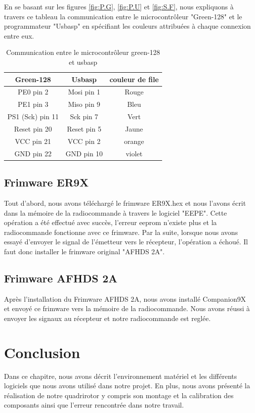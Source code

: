 	
	
	En se basant sur les figures \ref{fig:P.G}, \ref{fig:P.U} et \ref{fig:S.F}, nous expliquons à travers ce tableau la communication entre le microcontrôleur "Green-128" et le programmateur "Usbasp" en spécifiant les couleurs attribuées à chaque connexion entre eux.
	
	\begin{table}[H]
		\begin{center}
			\caption{Communication entre le microcontrôleur green-128 et usbasp }
			\begin{tabular}{|c|c|c|}
				\hline
				\centering
				Green-128 &	Usbasp & couleur de file \\
				\hline
				PE0 pin 2 & Mosi pin 1 & Rouge  \\
				\hline
				PE1 pin 3 & Miso pin 9 & Bleu  \\
				\hline
				PS1 (Sck)  pin 11 & Sck pin 7 & Vert  \\
				\hline
				Reset pin 20 & Reset pin 5 & Jaune \\
				\hline
				VCC pin 21 & VCC pin 2 &  orange \\
				\hline
				GND pin 22 & GND pin 10 & violet \\
				\hline
			\end{tabular}
		\end{center}
	\end{table}
	\subsection{Frimware ER9X}
	Tout d'abord, nous avons téléchargé le frimware ER9X.hex et nous l'avons écrit dans la mémoire de la radiocommande à travers le logiciel "EEPE". Cette opération a été effectué avec succès, l'erreur eeprom n'existe plus et la radiocommande fonctionne avec ce frimware. Par la suite, lorsque nous avons essayé d'envoyer le signal de l'émetteur vers le récepteur, l'opération a échoué. Il faut donc installer le frimware original "AFHDS 2A".
	\subsection{Frimware AFHDS 2A}
	Après l'installation du Frimware AFHDS 2A, nous avons installé Companion9X et envoyé ce frimware vers la mémoire de la radiocommande. Nous avons réussi à envoyer les signaux au récepteur et notre radiocommande est reglée.
	
	
 
	\section*{Conclusion}
	Dans ce chapitre, nous avons décrit l'environnement matériel et les différents logiciels que nous avons utilisé dans notre projet. En plus, nous avons présenté la réalisation de notre quadrirotor y compris son montage et la calibration des composants ainsi que l'erreur rencontrée dans notre travail.


